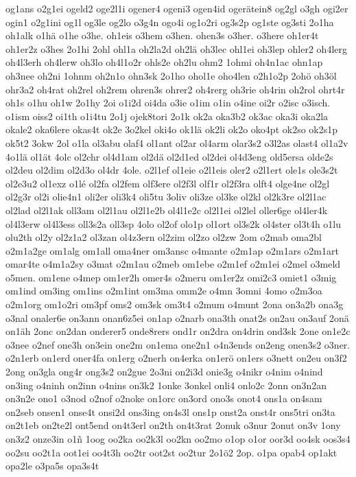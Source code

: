 {og1ans
o2g1ei
ogeld2
oge2l1i
ogener4
ogeni3
ogen4id
ogerätein8
og2gl
o3gh
ogi2er
ogin1
o2g1ini
og1l
og3le
og2lo
o3g4n
ogo4i
og1o2ri
og3s2p
og1ste
og3sti
2o1ha
oh1alk
o1hä
o1he
o3he.
oh1eis
o3hem
o3hen.
ohen3s
o3her.
o3here
oh1er4t
oh1er2z
o3hes
2o1hi
2ohl
ohl1a
oh2la2d
oh2lä
oh3lec
ohl1ei
oh3lep
ohler2
oh4lerg
oh4l3erh
oh4lerw
oh3lo
oh4l1o2r
ohls2e
oh2lu
ohm2
1ohmi
oh4n1ac
ohn1ap
oh3nee
oh2ni
1ohnm
oh2n1o
ohn3sk
2o1ho
ohol1e
oho4len
o2h1o2p
2ohö
oh3öl
ohr3a2
oh4rat
oh2rel
oh2rem
ohren3s
ohrer2
oh4rerg
oh3rie
oh4rin
oh2rol
ohrt4r
oh1s
o1hu
oh1w
2o1hy
2oi
o1i2d
oi4da
o3ie
o1im
o1in
o4ine
oi2r
o2isc
o3isch.
o1ism
oiss2
oi1th
o1i4tu
2o1j
ojek8tori
2o1k
ok2a
oka3b2
ok3ac
oka3i
oka2la
okale2
oka6lere
okas4t
ok2e
3o2kel
oki4o
ok1lä
ok2li
ok2o
oko4pt
ok2so
ok2s1p
ok5t2
3okw
2ol
o1la
ol3abu
olaf4
ol1ant
ol2ar
ol4arm
olar3s2
o3l2as
olast4
ol1a2v
4o1lä
ol1ät
4olc
ol2chr
ol4d1am
ol2dä
ol2d1ed
ol2dei
ol4d3eng
old5ersa
olde2s
ol2deu
ol2dim
ol2d3o
ol4dr
4ole.
o2l1ef
ol1eie
o2l1eis
oler2
o2l1ert
ole1s
ole3s2t
ol2e3u2
ol1exz
o1lé
ol2fa
ol2fem
olf3ere
ol2f3l
olf1r
ol2f3ra
olft4
olge4ne
ol2gl
ol2g3r
ol2i
olie4n1
oli2er
oli3k4
oli5tu
3oliv
oli3ze
ol3ke
ol2kl
ol2k3re
ol2l1ac
ol2lad
ol2l1ak
oll3am
ol2l1au
ol2l1e2b
ol4l1e2c
ol2l1ei
ol2lel
oller6ge
ol4ler4k
ol4l3erw
ol4l3ess
oll3s2a
oll3sp
4olo
ol2of
olo1p
ol1ort
ol3s2k
ol4ster
ol3t4h
o1lu
olu2th
ol2y
ol2z1a2
ol3zan
ol4z3ern
ol2zim
ol2zo
ol2zw
2om
o2mab
oma2bl
o2m1a2ge
om1alg
om1all
oma4ner
om3ansc
o4mante
o2m1ap
o2m1ars
o2m1art
omar4te
o4m1a2sy
o3mat
o2m1au
o2meb
om1ebe
o2m1ef
o2m1ei
o2mel
o3meld
o5men.
om1ene
o4mep
om1er2h
omer4s
o2meru
om1er2z
omi2c3
omiet1
o3mig
om1ind
om3ing
om1ins
o2m1int
om3ma
omm2e
o4mn
3omni
4omo
o2m3oa
o2m1org
om1o2ri
om3pf
oms2
om3sk
om3t4
o2mum
o4munt
2ona
on3a2b
ona3g
o3nal
onaler6e
on3ann
onan6z5ei
on1ap
o2narb
ona3th
onat2s
on2au
on3auf
2onä
on1äh
2onc
on2dan
onderer5
onde8rers
ond1r
on2dra
on4drin
ond3sk
2one
on1e2c
o3nee
o2nef
one3h
on3ein
one2m
on1ema
one2n1
o4n3ends
on2eng
onen3s2
o3ner.
o2n1erb
on1erd
oner4fa
on1erg
o2nerh
on4erka
on1erö
on1ers
o3nett
on2eu
on3f2
2ong
on3gla
ong4r
ong3s2
on2gue
2o3ni
on2i3d
onie3g
o4nikr
o4nim
o4nind
on3ing
o4ninh
on2inn
o4nins
on3k2
1onke
3onkel
onli4
onlo2c
2onn
on3n2an
on3n2e
ono1
o3nod
o2nof
o2noke
on1orc
on3ord
ono3s
onot4
ons1a
on4sam
on2seb
onsen1
onse4t
onsi2d
ons3ing
on4s3l
ons1p
onst2a
onst4r
ons5tri
on3ta
on2t1eb
on2te2l
ont5end
on4t3erl
on2th
on4t3rat
2onuk
o3nur
2onut
on3v
1ony
on3z2
onze3in
o1ñ
1oog
oo2ka
oo2k3l
oo2kn
oo2mo
o1op
o1or
oor3d
oo4sk
oos3s4
oo2su
oo2t1a
oot1ei
oo4t3h
oo2tr
oot2st
oo2tur
2o1ö2
2op.
o1pa
opab4
op1akt
opa2le
o3pa5s
opa3s4t
}
